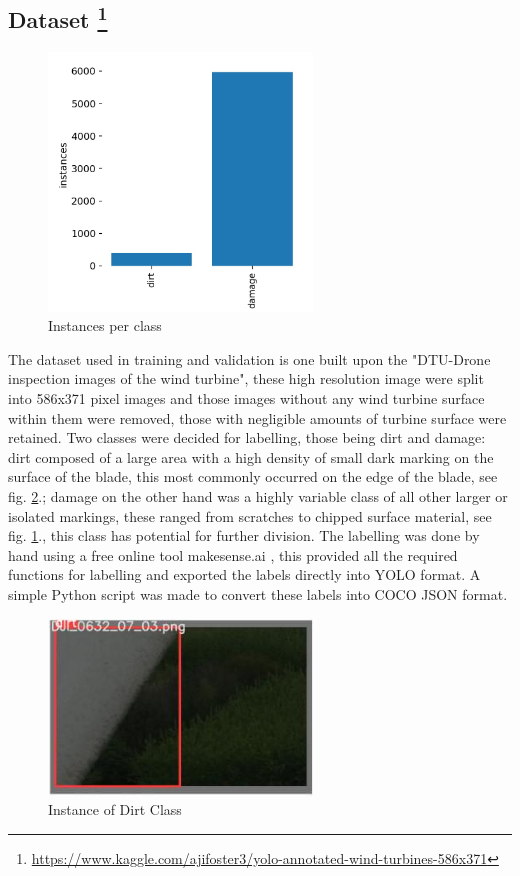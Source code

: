\documentclass[conference]{IEEEtran}
\begin{document}
\subsection{Dataset \footnote{\url{https://www.kaggle.com/ajifoster3/yolo-annotated-wind-turbines-586x371}}}

\begin{figure}[H]
    \centering
    \includegraphics[width=7cm]{Images/Label Count.png}
    \caption{Instances per class}
    \label{fig:damageex}
\end{figure}


The dataset used in training and validation is one built upon the "DTU-Drone inspection images of the wind turbine"\cite{DTU}, these high resolution image were split into 586x371 pixel images and those images without any wind turbine surface within them were removed, those with negligible amounts of turbine surface were retained. Two classes were decided for labelling, those being dirt and damage: dirt composed of a large area with a high density of small dark marking on the surface of the blade, this most commonly occurred on the edge of the blade, see fig. \ref{fig:dirtex}.; damage on the other hand was a highly variable class of all other larger or isolated markings, these ranged from scratches to chipped surface material, see fig. \ref{fig:damageex}., this class has potential for further division. The labelling was done by hand using a free online tool makesense.ai \cite{make-sense}, this provided all the required functions for labelling and exported the labels directly into YOLO format. A simple Python script was made to convert these labels into COCO JSON format.

\begin{figure}[H]
    \centering
    \includegraphics[width=7cm]{Images/Dirt Example.png}
    \caption{Instance of Dirt Class}
    \label{fig:dirtex}
\end{figure}
\end{document}
